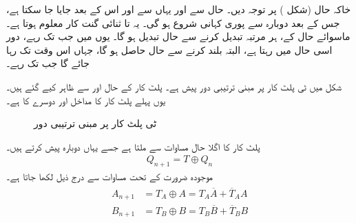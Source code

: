 خاکہ حال (شکل )  پر توجہ دیں۔ حال  سے  اور یہاں سے  اور اس کے بعد  جایا جا سکتا ہے، جس کے بعد دوبارہ     سے پوری کہانی شروع ہو گی۔ یہ  تا  ثنائی گنت کار معلوم ہوتا ہے۔ ماسوائے حال  کے،     ہر مرتبہ  تبدیل کرنے سے حال تبدیل ہو گا۔ یوں    میں جب تک  رہے، دور اسی حال میں رہتا ہے، البتہ  بلند کرنے سے  حال حاصل ہو گا، جہاں اس وقت تک رہا جائے گا جب تک  رہے۔



شکل    میں ٹی پلٹ کار پر مبنی ترتیبی دور  پیش ہے۔ پلٹ کار کے  حال  اور  سے ظاہر کیے گئے   ہیں۔یوں پہلے  پلٹ کار  کا    مداخل     اور دوسرے   کا  ہے۔
\begin{figure}
\centering
{}
\caption{ٹی پلٹ کار پر مبنی ترتیبی دور}
\label{شکل_ترتیبی_ٹی_پلٹ_ترتیبی_مثال}
\end{figure}

پلٹ کار کا اگلا حال    مساوات   سے  ملتا ہے جسے یہاں دوبارہ پیش کرتے ہیں۔
\begin{align*}
Q_{n+1}=T\oplus Q_n
\end{align*}
موجودہ  ضرورت کے تحت مساوات  سے  درج ذیل لکھا جاتا ہے۔
\begin{gather}
\begin{aligned}\label{مساوات_ترتیبی_ٹی_مثال_حال}
A_{n+1}&=T_A\oplus A=T_A \overline{A}+\overline{T}_AA\\
B_{n+1}&=T_B\oplus B=T_B\overline{B}+\overline{T}_BB
\end{aligned}
\end{gather}

